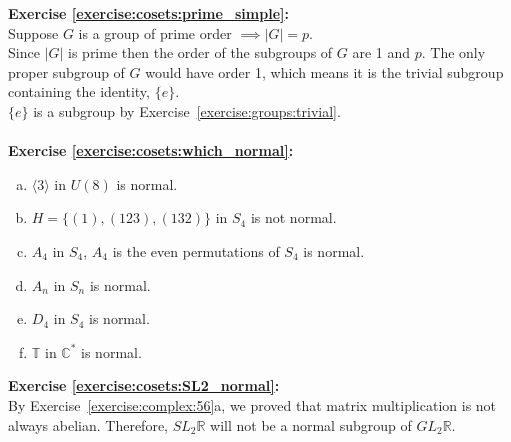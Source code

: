 \noindent\textbf{Exercise \ref{exercise:cosets:prime_simple}:}
\\
Suppose $G$ is a group of prime order $\implies |G| = p$.
\\
Since $|G|$ is prime then the order of the subgroups of $G$ are 1 and $p$.  The only proper subgroup of $G$ would have order 1, which means it is the trivial subgroup containing the identity, $\{e\}$.
\\
$\{e\}$ is a subgroup by Exercise~\ref{exercise:groups:trivial}.
\\
\\
\noindent\textbf{Exercise \ref{exercise:cosets:which_normal}:}
\begin{enumerate}[(a)]


\item
$\langle 3 \rangle$ in $U(8)$ is normal.


\item
$H = \{ (1), (123), (132) \}$ in $S_4$ is not normal.

\item
$A_4$ in $S_4$, $A_4$ is the even permutations of $S_4$ is normal.

\item
$A_n$ in $S_n$ is normal.

\item
$D_4$ in $S_4$ is normal.

\item
${\mathbb T}$ in ${\mathbb C}^\ast$ is normal.

\end{enumerate}


\noindent\textbf{Exercise \ref{exercise:cosets:SL2_normal}:}
\\
By Exercise~\ref{exercise:complex:56}a, we proved that matrix multiplication is not always abelian. Therefore, $SL_2{\mathbb R}$ will not be a normal subgroup of $GL_2{\mathbb R}$.

